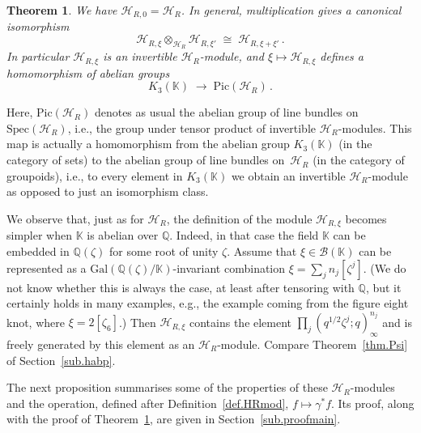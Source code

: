 \documentclass[12pt,reqno]{amsart}
\newcounter{theoremcount}
\newtheorem{theorem}[theoremcount]{Theorem}
\theoremstyle{definition}
\def\BQ{\mathbb Q}
\def\BK{\mathbb K}
\def\calB{\mathcal B}
\def\calH{\mathcal H}
\def\be{\begin{equation}}
\def\ee{\end{equation}}
\def\z{\zeta}
\begin{document}
\begin{theorem}
\label{thm.HR}
We have $\calH_{R,0}=\calH_R$. In general, multiplication gives a canonical isomorphism
\be
\calH_{R,\xi}\otimes_{\calH_R} \calH_{R,\xi'}
\;\cong\;
\calH_{R,\xi+\xi'}\,.
\ee
In particular $\calH_{R,\xi}$ is an invertible $\calH_R$-module, and
$\xi\mapsto \calH_{R,\xi}$ defines a homomorphism of abelian groups
\be
\label{eq:K3Pic}
K_3(\BK)\;\to\;
\mathrm{Pic}(\calH_{R})\,.
\ee
\end{theorem}
\noindent Here, $\mathrm{Pic}(\calH_{R})$ denotes as usual the abelian group of
line bundles on $\mathrm{Spec}(\calH_R)$, i.e., the group under tensor product of
invertible $\calH_R$-modules.
This map is actually a homomorphism from the abelian group $K_3(\BK)$ (in the category
of sets) to the abelian group of line bundles on~$\calH_{R}$ (in the category of
groupoids), i.e., to every element in $K_3(\BK)$ we obtain an invertible
\hbox{$\calH_R$-module} as opposed to just an isomorphism class.

We observe that, just as for $\calH_R$, the definition of the module $\calH_{R,\xi}$
becomes simpler when $\BK$ is abelian over $\BQ$. Indeed, in that case the field
$\BK$ can be embedded in $\BQ(\z)$ for some root of unity $\z$. Assume that
$\xi\in \calB(\BK)$ can be represented as a $\mathrm{Gal}(\BQ(\z)/\BK)$-invariant
combination $\xi=\sum_j n_j[\z^j]$. (We do not know whether this is always the case,
at least after tensoring with $\BQ$, but it certainly holds in many examples, e.g.,
the example coming from the figure eight knot, where $\xi=2[\z_6]$.)
Then $\calH_{R,\xi}$ contains the element $\prod_j(q^{1/2}\z^j;q)_\infty^{n_j}$ and is
freely generated by this element as an $\calH_R$-module.
Compare Theorem~\ref{thm.Psi} of Section~\ref{sub.habp}.

The next proposition summarises some of the properties of these $\calH_R$-modules
and the operation, defined after Definition~\ref{def.HRmod}, $f\mapsto \gamma^{*}f$.
Its proof, along with the proof of Theorem~\ref{thm.HR}, are given in
Section~\ref{sub.proofmain}.
\end{document}
